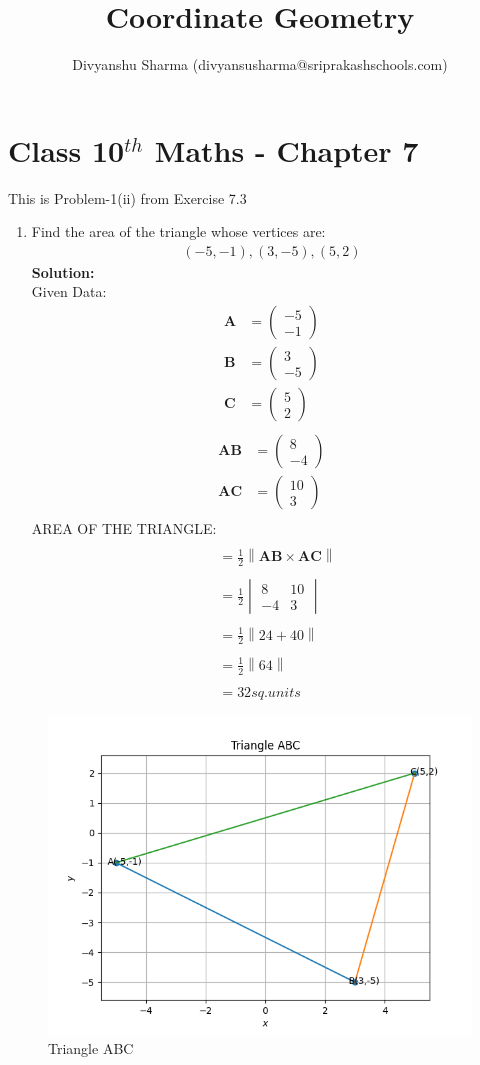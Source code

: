 \documentclass[10pt]{article}
\title{Coordinate Geometry}
\author{Divyanshu Sharma (divyansusharma@sriprakashschools.com)}
\newcommand{\myvec}[1]{\ensuremath{\begin{pmatrix}#1\end{pmatrix}}}
\newcommand{\mydet}[1]{\ensuremath{\begin{vmatrix}#1\end{vmatrix}}}
\newcommand{\solution}{\noindent \textbf{Solution: }}
\providecommand{\norm}[1]{\left\lVert#1\right\rVert}
\let\vec\mathbf
\begin{document}
\maketitle
\section*{Class 10$^{th}$ Maths - Chapter 7}
This is Problem-1(ii) from Exercise 7.3
\begin{enumerate}
\item Find the area of the triangle whose vertices are:
\begin{align}
{(-5,-1),(3,-5),(5,2)}
\end{align}
\solution \\
Given Data:
\begin{align}
\vec{A} &= \myvec{-5\\-1}\\
\vec{B} &= \myvec{3\\-5}\\
\vec{C} &= \myvec{5\\2}\\
\end{align}
\begin{align}
\vec{AB} &= \myvec{8\\-4}\\
\vec{AC} &= \myvec{10\\3}\\
\end{align}
AREA OF THE TRIANGLE:
\begin{align}
\\&=\frac{1}{2}\norm{{\vec{AB}}\times \vec{AC}}\\
\\&=\frac{1}{2}\mydet{8 & 10 \\ -4 & 3}\\
\\&=\frac{1}{2}\norm{24+40}\\
\\&=\frac{1}{2}\norm{64}\\
\\&= {32} sq.units
\end{align}
\end{enumerate}
\begin{figure}[H]
			\centering
			\includegraphics[width=\columnwidth]{figs/Figure_1.png}
			\caption{Triangle ABC}
			\label{fig:txn1}
		\end{figure}
\end{document}
